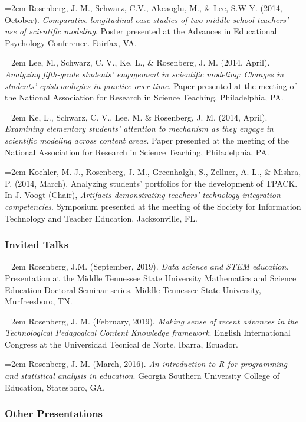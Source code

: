 \documentclass[14,]{article}
\begin{document}
\hangindent=2em Rosenberg, J. M., Schwarz, C.V., Akcaoglu, M., \& Lee,
S.W-Y. (2014, October). \emph{Comparative longitudinal case studies of
two middle school teachers' use of scientific modeling}. Poster
presented at the Advances in Educational Psychology Conference. Fairfax,
VA.

\hangindent=2em Lee, M., Schwarz, C. V., Ke, L., \& Rosenberg, J. M.
(2014, April). \emph{Analyzing fifth-grade students' engagement in
scientific modeling: Changes in students' epistemologies-in-practice
over time}. Paper presented at the meeting of the National Association
for Research in Science Teaching, Philadelphia, PA.

\hangindent=2em Ke, L., Schwarz, C. V., Lee, M. \& Rosenberg, J. M.
(2014, April). \emph{Examining elementary students' attention to
mechanism as they engage in scientific modeling across content areas}.
Paper presented at the meeting of the National Association for Research
in Science Teaching, Philadelphia, PA.

\hangindent=2em Koehler, M. J., Rosenberg, J. M., Greenhalgh, S.,
Zellner, A. L., \& Mishra, P. (2014, March). Analyzing students'
portfolios for the development of TPACK. In J. Voogt (Chair),
\emph{Artifacts demonstrating teachers' technology integration
competencies}. Symposium presented at the meeting of the Society for
Information Technology and Teacher Education, Jacksonville, FL.

\hypertarget{invited-talks}{%
\subsubsection{Invited Talks}\label{invited-talks}}

\hangindent=2em Rosenberg, J.M. (September, 2019). \emph{Data science
and STEM education}. Presentation at the Middle Tennessee State
University Mathematics and Science Education Doctoral Seminar series.
Middle Tennessee State University, Murfreesboro, TN.

\hangindent=2em Rosenberg, J. M. (February, 2019). \emph{Making sense of
recent advances in the Technological Pedagogical Content Knowledge
framework}. English International Congress at the Universidad Tecnical
de Norte, Ibarra, Ecuador.

\hangindent=2em Rosenberg, J. M. (March, 2016). \emph{An introduction to
R for programming and statistical analysis in education}. Georgia
Southern University College of Education, Statesboro, GA.

\hypertarget{other-presentations}{%
\subsubsection{Other Presentations}\label{other-presentations}}
\end{document}

